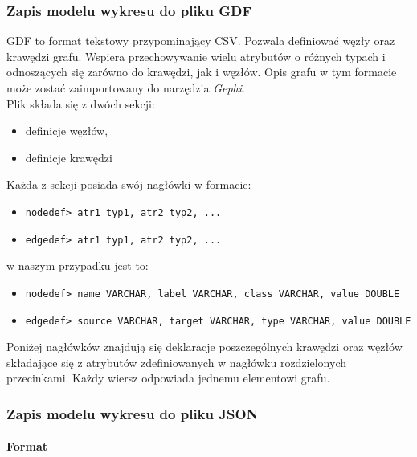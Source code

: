 \documentclass[12pt,a4paper]{article} %
\begin{document}
            \subsubsection{Zapis modelu wykresu do pliku GDF}
                GDF to format tekstowy przypominający CSV. Pozwala definiować węzły oraz krawędzi grafu. Wspiera przechowywanie wielu atrybutów o różnych typach i odnoszących się zarówno do krawędzi, jak i węzłów. Opis grafu w tym formacie może zostać zaimportowany do narzędzia \emph{Gephi}.\\
                Plik składa się z dwóch sekcji:
                \begin{itemize}
                    \item definicje węzłów,
                    \item definicje krawędzi
                \end{itemize}
                Każda z sekcji posiada swój nagłówki w formacie:
                \begin{itemize}
                \item \lstinline{nodedef> atr1 typ1, atr2 typ2, ...}
                \item \lstinline{edgedef> atr1 typ1, atr2 typ2, ...}
                \end{itemize}
                w naszym przypadku jest to:
                \begin{itemize}
                \item \lstinline{nodedef> name VARCHAR, label VARCHAR, class VARCHAR, value DOUBLE}
                \item \lstinline{edgedef> source VARCHAR, target VARCHAR, type VARCHAR, value DOUBLE}
                \end{itemize}
                Poniżej nagłówków znajdują się deklaracje poszczególnych krawędzi oraz węzłów składające się z atrybutów zdefiniowanych w nagłówku rozdzielonych przecinkami. Każdy wiersz odpowiada jednemu elementowi grafu.
                
            \subsubsection{Zapis modelu wykresu do pliku JSON}\label{json}
                \paragraph{Format}\\
                
\end{document}
